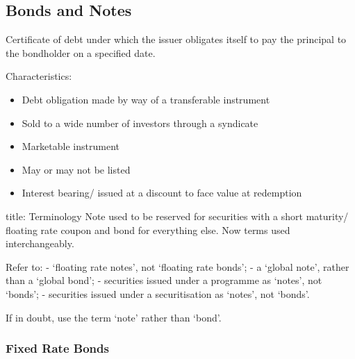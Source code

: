 \documentclass[
]{article}
\newenvironment{Shaded}{}{}
\newcommand{\NormalTok}[1]{#1}
\providecommand{\tightlist}{%
  \setlength{\itemsep}{0pt}\setlength{\parskip}{0pt}}
\begin{document}
\hypertarget{bonds-and-notes}{%
\subsection{Bonds and Notes}\label{bonds-and-notes}}

\begin{Shaded}
\begin{Highlighting}[]
\NormalTok{Certificate of debt under which the issuer obligates itself to pay the principal to the bondholder on a specified date.}
\end{Highlighting}
\end{Shaded}

Characteristics:

\begin{itemize}
\tightlist
\item
  Debt obligation made by way of a transferable instrument
\item
  Sold to a wide number of investors through a syndicate
\item
  Marketable instrument
\item
  May or may not be listed
\item
  Interest bearing/ issued at a discount to face value at redemption
\end{itemize}

\begin{Shaded}
\begin{Highlighting}[]
\NormalTok{title: Terminology}
\NormalTok{Note used to be reserved for securities with a short maturity/ floating rate coupon and bond for everything else. Now terms used interchangeably. }

\NormalTok{Refer to:}
\NormalTok{{-} ‘floating rate notes’, not ‘floating rate bonds’;}
\NormalTok{{-} a ‘global note’, rather than a ‘global bond’;}
\NormalTok{{-} securities issued under a programme as ‘notes’, not ‘bonds’;}
\NormalTok{{-} securities issued under a securitisation as ‘notes’, not ‘bonds’.}

\NormalTok{If in doubt, use the term ‘note’ rather than ‘bond’.}
\end{Highlighting}
\end{Shaded}

\hypertarget{fixed-rate-bonds}{%
\subsubsection{Fixed Rate Bonds}\label{fixed-rate-bonds}}
\end{document}

